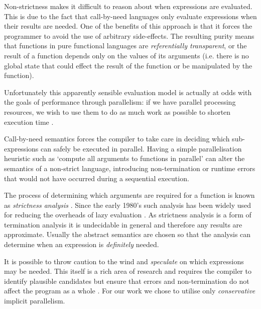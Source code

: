 Non-strictness makes it difficult to reason about when expressions are
evaluated. This is due to the fact that call-by-need languages only evaluate
expressions when their results are needed. One of the benefits of this
approach is that it forces the programmer to avoid the use of arbitrary
side-effects. The resulting purity means that functions in pure functional
languages are \emph{referentially transparent}, or the result of a function
depends only on the values of its arguments (i.e.  there is no global state
that could effect the result of the function or be manipulated by the
function).

Unfortunately this apparently sensible evaluation model is actually at odds
with the goals of performance through parallelism: if we have parallel
processing resources, we wish to use them to do as much work as possible to
shorten execution time \citep{tremblay1995impact}.

Call-by-need semantics forces the compiler to take care in deciding which
sub-expressions can safely be executed in parallel.  Having a simple
parallelisation heuristic such as `compute all arguments to functions in
parallel' can alter the semantics of a non-strict language, introducing
non-termination or runtime errors that would not have occurred during a
sequential execution.

The process of determining which arguments are required for a function is known
as \emph{strictness analysis} \citep{mycroft1980theory}. Since the early 1980's
such analysis has been widely used for reducing the overheads of lazy evaluation
\citep{SergeyDemand}. As strictness analysis is a form of termination analysis
it is undecidable in general and therefore any results are approximate. Usually
the abstract semantics are chosen so that the analysis can determine when
an expression is \emph{definitely} needed.

It is possible to throw caution to the wind and \emph{speculate} on which
expressions may be needed. This itself is a rich area of research and requires
the compiler to identify plausible candidates but ensure that errors and
non-termination do not affect the program as a whole . For our work we chose to utilise only \emph{conservative}
implicit parallelism.


